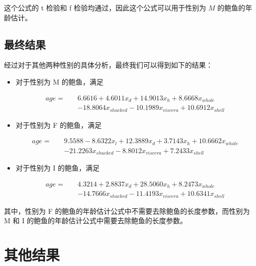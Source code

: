 \documentclass[hyperref,UTF8,12pt,a4paper]{ctexart}
\begin{document}
这个公式的 t 检验和 f 检验均通过，因此这个公式可以用于性别为 $M$ 的鲍鱼的年龄估计。

\subsection{最终结果}

经过对于其他两种性别的具体分析，最终我们可以得到如下的结果：

\begin{itemize}
\item 对于性别为 M 的鲍鱼，满足

\begin{equation}
  \begin{aligned}
    age =\quad & 6.6616 + 4.6011 x_d + 14.9013 x_h + 8.6668 x_{whole}  \\
    &-18.8064 x_{shucked} -10.1989 x_{viscera} + 10.6912 x_{shell}
  \end{aligned}
\end{equation}

\item 对于性别为 F 的鲍鱼，满足

\begin{equation}
  \begin{aligned}
    age =\quad & 9.5588 -8.6322 x_l + 12.3889 x_d + 3.7143 x_h + 10.6662 x_{whole}  \\
    &-21.2263 x_{shucked} -8.8012 x_{viscera} + 7.2433 x_{shell}
  \end{aligned}
\end{equation}

\item 对于性别为 I 的鲍鱼，满足

\begin{equation}
  \begin{aligned}
    age =\quad & 4.3214 +2.8837 x_d + 28.5060 x_h + 8.2473 x_{whole}  \\
    &-14.7666 x_{shucked} -11.4193 x_{viscera} + 10.6341 x_{shell}
  \end{aligned}
\end{equation}

\end{itemize}

其中，性别为 F 的鲍鱼的年龄估计公式中不需要去除鲍鱼的长度参数，而性别为 M 和 I 的鲍鱼的年龄估计公式中需要去除鲍鱼的长度参数。

\section{其他结果}
\end{document}
